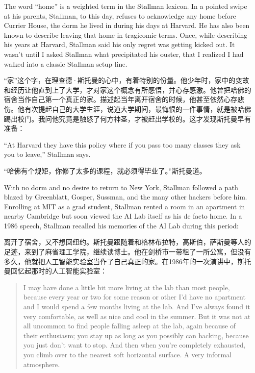 \ifdefined\eng
The word ``home'' is a weighted term in the Stallman lexicon. In a pointed swipe at his parents, Stallman, to this day, refuses to acknowledge any home before Currier House, the dorm he lived in during his days at Harvard. He has also been known to describe leaving that home in tragicomic terms. Once, while describing his years at Harvard, Stallman said his only regret was getting kicked out. It wasn't until I asked Stallman what precipitated his ouster, that I realized I had walked into a classic Stallman setup line.
\fi

\ifdefined\chs
``家''这个字，在理查德·斯托曼的心中，有着特别的份量。他少年时，家中的变故和经历让他直到上了大学，才对家这个概念有所感悟，并心存感激。他曾把哈佛的宿舍当作自己第一个真正的家。描述起当年离开宿舍的时候，他甚至依然心存悲伤。他有次提起自己的大学生涯，说道大学期间，最悔恨的一件事情，就是被哈佛踢出校门。我问他究竟是触怒了何方神圣，才被赶出学校的。这才发现斯托曼早有准备：
\fi

\ifdefined\eng
``At Harvard they have this policy where if you pass too many classes they ask you to leave,'' Stallman says.
\fi

\ifdefined\chs
``哈佛有个规矩，你修了太多的课程，就必须得毕业了。''斯托曼道。
\fi

\ifdefined\eng
With no dorm and no desire to return to New York, Stallman followed a path blazed by Greenblatt, Gosper, Sussman, and the many other hackers before him. Enrolling at MIT as a grad student, Stallman rented a room in an apartment in nearby Cambridge but soon viewed the AI Lab itself as his de facto home. In a 1986 speech, Stallman recalled his memories of the AI Lab during this period:
\fi

\ifdefined\chs
离开了宿舍，又不想回纽约。斯托曼跟随着和格林布拉特，高斯伯，萨斯曼等人的足迹，来到了麻省理工学院，继续读博士。他在剑桥市一带租了一所公寓，但没有多久，他就把人工智能实验室当作了自己真正的家。在1986年的一次演讲中，斯托曼回忆起那时的人工智能实验室：
\fi

\ifdefined\eng
\begin{quote}
I may have done a little bit more living at the lab than most people, because every year or two for some reason or other I'd have no apartment and I would spend a few months living at the lab. And I've always found it very comfortable, as well as nice and cool in the summer. But it was not at all uncommon to find people falling asleep at the lab, again because of their enthusiasm; you stay up as long as you possibly can hacking, because you just don't want to stop. And then when you're completely exhausted, you climb over to the nearest soft horizontal surface. A very informal atmosphere.
\end{quote}
\fi


